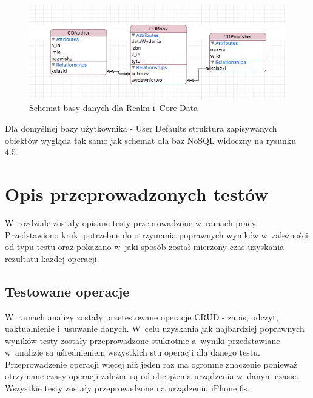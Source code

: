 \begin{figure}[h]
\centering
	\includegraphics[width=\linewidth]{img/database/document-sheme.png}
	\caption{Schemat basy danych dla Realm i~Core Data}
	\label{fig: nosql_data_scheme}
\end{figure}

Dla domyślnej bazy użytkownika - User Defaults struktura zapisywanych obiektów wygląda tak samo jak schemat dla baz NoSQL widoczny na rysunku 4.5. \par 

\section{Opis przeprowadzonych testów}

 W~rozdziale zostały opisane testy przeprowadzone w~ramach pracy. Przedstawiono kroki potrzebne do otrzymania poprawnych wyników w~zależności od typu testu oraz pokazano w~jaki sposób został mierzony czas uzyskania rezultatu każdej operacji. 

\subsection{Testowane operacje}

 W~ramach analizy zostały przetestowane operacje CRUD - zapis, odczyt, uaktualnienie i~usuwanie danych. W~celu uzyskania jak najbardziej poprawnych wyników testy zostały przeprowadzone stukrotnie a~wyniki przedstawiane w~analizie są uśrednieniem wszystkich stu operacji dla danego testu. Przeprowadzenie operacji więcej niż jeden raz ma ogromne znaczenie ponieważ otrzymane czasy operacji zależne są od obciążenia urządzenia w~danym czasie. Wszystkie testy zostały przeprowadzone na  urządzeniu iPhone 6s. \par

